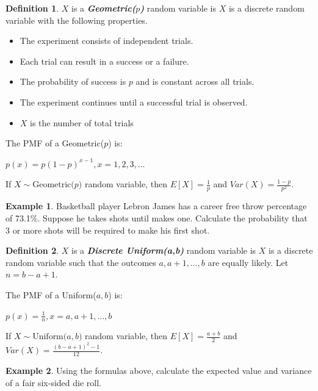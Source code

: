\documentclass[
  11pt,
  oneside]{book}
\theoremstyle{definition}
\newtheorem{definition}{Definition}[chapter]
\theoremstyle{definition}
\newtheorem{example}{Example}[chapter]
\theoremstyle{definition}
\theoremstyle{definition}
\theoremstyle{remark}
\begin{document}
\begin{definition}
\(X\) is a \textbf{\emph{Geometric(\(p\))}} random variable is \(X\) is a discrete random variable with the following properties.

\begin{itemize}
\item The experiment consists of independent trials.
\item Each trial can result in a success or a failure.
\item The probability of success is $p$ and is constant across all trials.
\item The experiment continues until a successful trial is observed.
\item $X$ is the number of total trials
\end{itemize}

The PMF of a Geometric(\(p\)) is:

\(p(x) = p(1-p)^{x-1}, x = 1, 2, 3, \ldots\)

If \(X \sim \text{Geometric(}p)\) random variable, then \(E[X] = \frac{1}{p}\) and \(Var(X) = \frac{1-p}{p^2}\).
\end{definition}

\begin{example}
Basketball player Lebron James has a career free throw percentage of 73.1\%. Suppose he takes shots until makes one. Calculate the probability that 3 or more shots will be required to make his first shot.
\end{example}

\newpage

\begin{definition}
\(X\) is a \textbf{\emph{Discrete Uniform(a,b)}} random variable is \(X\) is a discrete random variable such that the outcomes \(a, a+1, \ldots, b\) are equally likely. Let \(n = b-a+1\).

The PMF of a Uniform(\(a,b\)) is:

\(p(x) = \frac{1}{n}, x = a, a+1, \ldots, b\)

If \(X \sim \text{Uniform(}a,b)\) random variable, then \(E[X] = \frac{a+b}{2}\) and \(Var(X) = \frac{(b-a+1)^2-1}{12}\).
\end{definition}

\begin{example}
Using the formulas above, calculate the expected value and variance of a fair six-sided die roll.
\end{example}

\vfill
\end{document}
